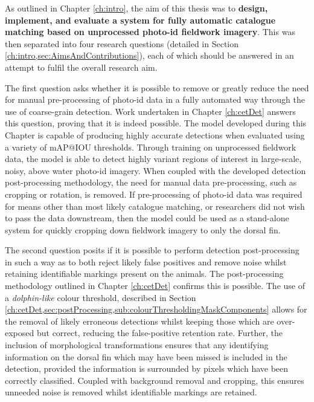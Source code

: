 As outlined in Chapter \ref{ch:intro}, the aim of this thesis was to \textbf{design, implement, and evaluate a system for fully automatic catalogue matching based on unprocessed photo-id fieldwork imagery}. This was then separated into four research questions (detailed in Section \ref{ch:intro,sec:AimsAndContributions}), each of which should be answered in an attempt to fulfil the overall research aim. 

The first question asks whether it is possible to remove or greatly reduce the need for manual pre-processing of photo-id data in a fully automated way through the use of coarse-grain detection. Work undertaken in Chapter \ref{ch:cetDet} answers this question, proving that it is indeed possible. The model developed during this Chapter is capable of producing highly accurate detections when evaluated using a variety of mAP@IOU thresholds. Through training on unprocessed fieldwork data, the model is able to detect highly variant regions of interest in large-scale, noisy, above water photo-id imagery. When coupled with the developed detection post-processing methodology, the need for manual data pre-processing, such as cropping or rotation, is removed. If pre-processing of photo-id data was required for means other than most likely catalogue matching, or researchers did not wish to pass the data downstream, then the model could be used as a stand-alone system for quickly cropping down fieldwork imagery to only the dorsal fin. 

The second question posits if it is possible to perform detection post-processing in such a way as to both reject likely false positives and remove noise whilst retaining identifiable markings present on the animals. The post-processing methodology outlined in Chapter \ref{ch:cetDet} confirms this is possible. The use of a \textit{dolphin-like} colour threshold, described in Section \ref{ch:cetDet,sec:postProcessing,sub:colourThresholdingMaskComponents} allows for the removal of likely erroneous detections whilst keeping those which are over-exposed but correct, reducing the false-positive retention rate. Further, the inclusion of morphological transformations ensures that any identifying information on the dorsal fin which may have been missed is included in the detection, provided the information is surrounded by pixels which have been correctly classified. Coupled with background removal and cropping, this ensures unneeded noise is removed whilst identifiable markings are retained. 

